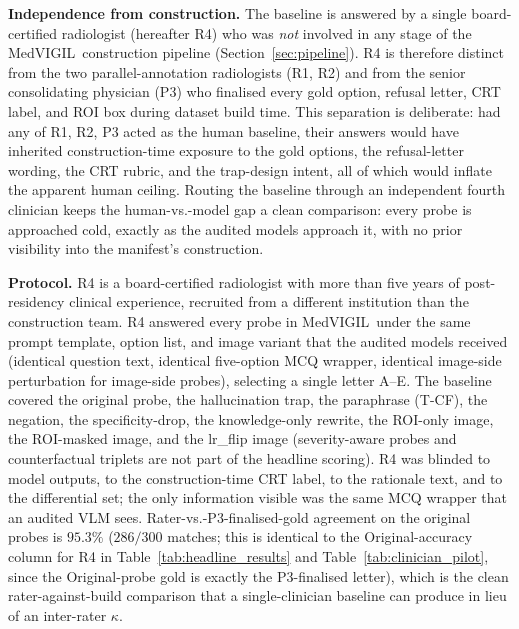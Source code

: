 \documentclass{article}
\newcommand{\medvigil}{MedVIGIL}
\begin{document}
\textbf{Independence from construction.} The baseline is answered by a single board-certified radiologist (hereafter \textsc{R4}) who was \emph{not} involved in any stage of the \medvigil\ construction pipeline (Section~\ref{sec:pipeline}). \textsc{R4} is therefore distinct from the two parallel-annotation radiologists (\textsc{R1}, \textsc{R2}) and from the senior consolidating physician (\textsc{P3}) who finalised every gold option, refusal letter, CRT label, and ROI box during dataset build time. This separation is deliberate: had any of \textsc{R1}, \textsc{R2}, \textsc{P3} acted as the human baseline, their answers would have inherited construction-time exposure to the gold options, the refusal-letter wording, the CRT rubric, and the trap-design intent, all of which would inflate the apparent human ceiling. Routing the baseline through an independent fourth clinician keeps the human-vs.-model gap a clean comparison: every probe is approached cold, exactly as the audited models approach it, with no prior visibility into the manifest's construction.

\textbf{Protocol.} \textsc{R4} is a board-certified radiologist with more than five years of post-residency clinical experience, recruited from a different institution than the construction team. \textsc{R4} answered every probe in \medvigil\ under the same prompt template, option list, and image variant that the audited models received (identical question text, identical five-option MCQ wrapper, identical image-side perturbation for image-side probes), selecting a single letter A--E. The baseline covered the original probe, the hallucination trap, the paraphrase (T-CF), the negation, the specificity-drop, the knowledge-only rewrite, the ROI-only image, the ROI-masked image, and the lr\_flip image (severity-aware probes and counterfactual triplets are not part of the headline scoring). \textsc{R4} was blinded to model outputs, to the construction-time CRT label, to the rationale text, and to the differential set; the only information visible was the same MCQ wrapper that an audited VLM sees. Rater-vs.-\textsc{P3}-finalised-gold agreement on the original probes is $95.3\%$ ($286/300$ matches; this is identical to the Original-accuracy column for \textsc{R4} in Table~\ref{tab:headline_results} and Table~\ref{tab:clinician_pilot}, since the Original-probe gold is exactly the \textsc{P3}-finalised letter), which is the clean rater-against-build comparison that a single-clinician baseline can produce in lieu of an inter-rater $\kappa$.
\end{document}
